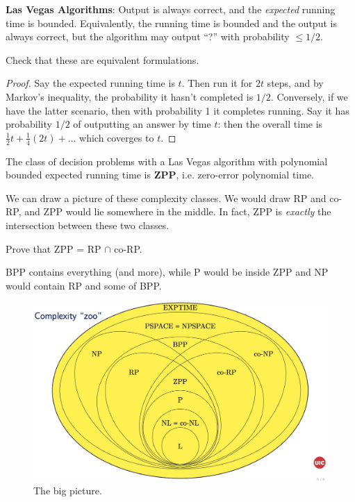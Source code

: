 \documentclass[11 pt]{scrartcl}
\begin{document}
\begin{enumerate}
    \ii \textbf{Las Vegas Algorithms}: Output is always correct, and the \emph{expected} running time is bounded. Equivalently, the running time is bounded and the output is always correct, but the algorithm may output ``?'' with probability $\leq 1/2$. 
    \begin{exercise}
    Check that these are equivalent formulations.
    \end{exercise}
    \begin{proof}
        Say the expected running time is $t$. Then run it for $2t$ steps, and by Markov's inequality, the probability it hasn't completed is $1/2$. Conversely, if we have the latter scenario, then with probability 1 it completes running. Say it has probability $1/2$ of outputting an answer by time $t$: then the overall time is $\frac{1}{2}t + \frac{1}{4}(2t) + \dots$ which coverges to $t$.  
    \end{proof}

    The class of decision problems with a Las Vegas algorithm with polynomial bounded expected running time is \textbf{ZPP}, i.e. zero-error polynomial time. 
\end{enumerate}

We can draw a picture of these complexity classes. We would draw RP and co-RP, and ZPP would lie somewhere in the middle. In fact, ZPP is \emph{exactly} the intersection between these two classes. 

\begin{exercise}
    Prove that ZPP = RP $\cap$ co-RP. 
\end{exercise}

BPP contains everything (and more), while P would be inside ZPP and NP would contain RP and some of BPP.

\begin{figure}[!htb]
    \centering
    \includegraphics[scale=0.3]{complexity.jpg}
    \caption{The big picture.}
\end{figure}
\end{document}
